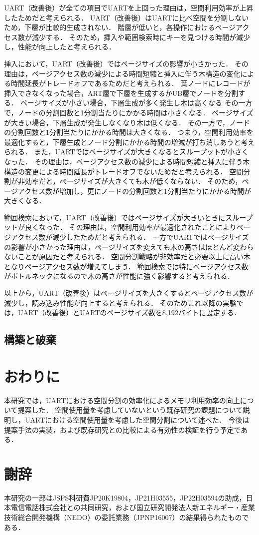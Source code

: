 UART（改善後）が全ての項目でUARTを上回った理由は，空間利用効率が上昇したためだと考えられる．
UART（改善後）はUARTに比べ空間を分割しないため，下層が比較的生成されない．
階層が低いと，各操作におけるページアクセス数が減少する．
そのため，挿入や範囲検索時にキーを見つける時間が減少し，性能が向上したと考えられる．

挿入において，UART（改善後）ではページサイズの影響が小さかった．
その理由は，ページアクセス数の減少による時間短縮と挿入に伴う木構造の変化による時間延長がトレードオフであるためだと考えられる．
葉ノードにレコードが挿入できなくなった場合，ART層で下層を生成するかUB層でノードを分割する．
ページサイズが小さい場合，下層生成が多く発生し木は高くなる
その一方で，ノードの分割回数と1分割当たりにかかる時間は小さくなる．
ページサイズが大きい場合，下層生成が発生しなくなり木は低くなる．
その一方で，ノードの分割回数と1分割当たりにかかる時間は大きくなる．
つまり，空間利用効率を最適化すると，下層生成とノード分割にかかる時間の増減が打ち消しあうと考えられる．
また，UARTではページサイズが大きくなるとスループットが小さくなった．
その理由は，ページアクセス数の減少による時間短縮と挿入に伴う木構造の変更による時間延長がトレードオフでないためだと考えられる．
空間分割が非効率だと，ページサイズが大きくても木が低くならない．
そのため，ページアクセス数が増加し，更にノードの分割回数と1分割当たりにかかる時間が大きくなる．

範囲検索において，UART（改善後）ではページサイズが大きいときにスループットが良くなった．
その理由は，空間利用効率が最適化されたことによりページアクセス数が減少したためだと考えられる．
一方でUARTではページサイズの影響が小さかった理由は，ページサイズを変えても木の高さはほとんど変わらないことが原因だと考えられる．
空間分割戦略が非効率だと必要以上に高い木となりページアクセス数が増えてしまう．
範囲検索では特にページアクセス数がボトルネックになるので木の高さが性能に強く影響すると考えられる．

以上から，UART（改善後）はページサイズを大きくするとページアクセス数が減少し，読み込み性能が向上すると考えられる．
そのためこれ以降の実験では，UART（改善後）とUARTのページサイズ数を8,192バイトに設定する．

\section{構築と破棄}



\chapter{おわりに}

本研究では，UARTにおける空間分割の効率化によるメモリ利用効率の向上について提案した．
空間使用量を考慮していないという既存研究の課題について説明し，UARTにおける空間使用量を考慮した空間分割について述べた．
今後は提案手法の実装，および既存研究との比較による有効性の検証を行う予定である．





\chapter*{謝辞}

本研究の一部はJSPS科研費JP20K19804，JP21H03555，JP22H03594の助成，日本電信電話株式会社との共同研究，および国立研究開発法人新エネルギー・産業技術総合開発機構（NEDO）の委託業務（JPNP16007）の結果得られたものである．